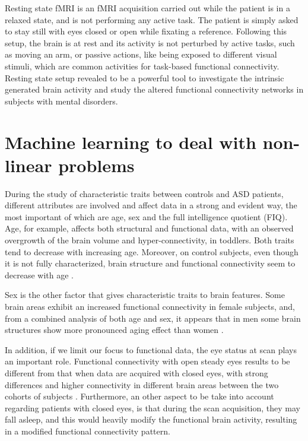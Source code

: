 \documentclass[11pt]{report}
\begin{document}
Resting state fMRI is an fMRI acquisition carried out while the patient is in a relaxed state, and is not performing any active task.
The patient is simply asked to stay still with eyes closed or open while fixating a reference.
Following this setup, the brain is at rest and its activity is not perturbed by active tasks, such as moving an arm, or passive actions, like being exposed to different visual stimuli, which are common activities for task-based functional connectivity.
Resting state setup revealed to be a powerful tool to investigate the intrinsic generated brain activity and study the altered functional connectivity networks in subjects with mental disorders.

\section{Machine learning to deal with non-linear problems}\label{sec:intro_ml}
During the study of characteristic traits between controls and ASD patients, different attributes are involved and affect data in a strong and evident way, the most important of which are age, sex and the full intelligence quotient (FIQ).
Age, for example, affects both structural and functional data, with an observed overgrowth of the brain volume and hyper-connectivity, in toddlers. Both traits tend to decrease with increasing age.
Moreover, on control subjects, even though it is not fully characterized, brain structure and functional connectivity seem to decrease with age \cite{zhangC-2016}.

Sex is the other factor that gives characteristic traits to brain features.
Some brain areas exhibit an increased functional connectivity in female subjects, and, from a combined analysis of both age and sex, it appears that in men some brain structures show more pronounced aging effect than women \cite{coffey-1998}.

In addition, if we limit our focus to functional data, the eye status at scan plays an important role.
Functional connectivity with open steady eyes results to be different from that when data are acquired with closed eyes, with strong differences and higher connectivity in different brain areas between the two cohorts of subjects \cite{costumero-2020}.
Furthermore, an other aspect to be take into account regarding patients with closed eyes, is that during the scan acquisition, they may fall asleep, and this would heavily modify the functional brain activity, resulting in a modified functional connectivity pattern.
\end{document}
